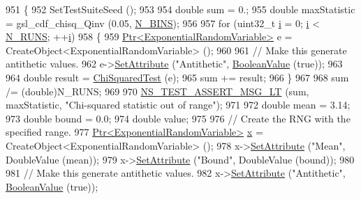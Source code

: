 \begin{DoxyCode}
951 \{
952   SetTestSuiteSeed ();
953 
954   \textcolor{keywordtype}{double} sum = 0.;
955   \textcolor{keywordtype}{double} maxStatistic = gsl\_cdf\_chisq\_Qinv (0.05, \hyperlink{classRandomVariableStreamExponentialAntitheticTestCase_a7ffc40bce73013db87de6e45a5f1851e}{N\_BINS});
956 
957   \textcolor{keywordflow}{for} (uint32\_t \hyperlink{bernuolliDistribution_8m_a6f6ccfcf58b31cb6412107d9d5281426}{i} = 0; \hyperlink{bernuolliDistribution_8m_a6f6ccfcf58b31cb6412107d9d5281426}{i} < \hyperlink{classRandomVariableStreamExponentialAntitheticTestCase_ae6a025b7e35adcd815a269e2882dbfa8}{N\_RUNS}; ++\hyperlink{bernuolliDistribution_8m_a6f6ccfcf58b31cb6412107d9d5281426}{i})
958     \{
959       \hyperlink{classns3_1_1Ptr}{Ptr<ExponentialRandomVariable>} e = 
      CreateObject<ExponentialRandomVariable> ();
960 
961       \textcolor{comment}{// Make this generate antithetic values.}
962       e->\hyperlink{classns3_1_1ObjectBase_ac60245d3ea4123bbc9b1d391f1f6592f}{SetAttribute} (\textcolor{stringliteral}{"Antithetic"}, \hyperlink{classns3_1_1BooleanValue}{BooleanValue} (\textcolor{keyword}{true}));
963 
964       \textcolor{keywordtype}{double} result = \hyperlink{classRandomVariableStreamExponentialAntitheticTestCase_a09f3e59c6175e60b09cfcb5ba650a86b}{ChiSquaredTest} (e);
965       sum += result;
966     \}
967 
968   sum /= (double)N\_RUNS;
969 
970   \hyperlink{group__testing_ga1d96848b91407c9a0b36583e8b0ad7ae}{NS\_TEST\_ASSERT\_MSG\_LT} (sum, maxStatistic, \textcolor{stringliteral}{"Chi-squared statistic out of range"});
971 
972   \textcolor{keywordtype}{double} mean = 3.14;
973   \textcolor{keywordtype}{double} bound = 0.0;
974   \textcolor{keywordtype}{double} value;
975 
976   \textcolor{comment}{// Create the RNG with the specified range.}
977   \hyperlink{classns3_1_1Ptr}{Ptr<ExponentialRandomVariable>} \hyperlink{lte__link__budget__x2__handover__measures_8m_a9336ebf25087d91c818ee6e9ec29f8c1}{x} = CreateObject<ExponentialRandomVariable>
       ();
978   x->\hyperlink{classns3_1_1ObjectBase_ac60245d3ea4123bbc9b1d391f1f6592f}{SetAttribute} (\textcolor{stringliteral}{"Mean"}, DoubleValue (mean));
979   x->\hyperlink{classns3_1_1ObjectBase_ac60245d3ea4123bbc9b1d391f1f6592f}{SetAttribute} (\textcolor{stringliteral}{"Bound"}, DoubleValue (bound));
980 
981   \textcolor{comment}{// Make this generate antithetic values.}
982   x->\hyperlink{classns3_1_1ObjectBase_ac60245d3ea4123bbc9b1d391f1f6592f}{SetAttribute} (\textcolor{stringliteral}{"Antithetic"}, \hyperlink{classns3_1_1BooleanValue}{BooleanValue} (\textcolor{keyword}{true}));

\end{DoxyCode}
